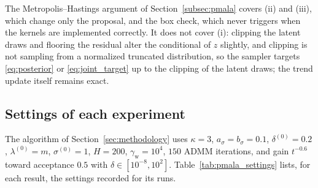 The Metropolis--Hastings argument of Section~\ref{subsec:pmala} covers (ii) and (iii), which change only the proposal, and the box check, which never triggers when the kernels are implemented correctly. It does not cover (i): clipping the latent draws and flooring the residual alter the conditional of $z$ slightly, and clipping is not sampling from a normalized truncated distribution, so the sampler targets \eqref{eq:posterior} or \eqref{eq:joint_target} up to the clipping of the latent draws; the trend update itself remains exact.

\subsection{Settings of each experiment}
\label{app:pmala:settings}

The algorithm of Section~\ref{sec:methodology} uses $\kappa = 3$, $a_\sigma = b_\sigma = 0.1$, $\delta^{(0)} = 0.2$, $\lambda^{(0)} = m$, $\sigma^{(0)} = 1$, $H = 200$, $\gamma_{\mathrm{w}} = 10^4$, $150$ ADMM iterations, and gain $t^{-0.6}$ toward acceptance $0.5$ with $\delta \in [10^{-8}, 10^2]$. Table~\ref{tab:pmala_settings} lists, for each result, the settings recorded for its runs.

